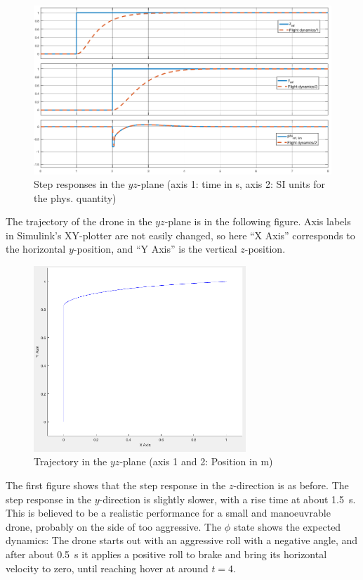 \documentclass[a4paper]{report}
\begin{document}
\begin{figure}[H]
\centering
\includegraphics[width=15cm]{img/step_response_2d.png}
\caption{Step responses in the $yz$-plane (axis 1: time in \si{\second}, axis 2: SI units for the phys. quantity)\label{fig:step_response_2d}}
\end{figure}

The trajectory of the drone in the $yz$-plane is in the following figure. 
Axis labels in Simulink's XY-plotter are not easily changed, so here ``X Axis'' corresponds to the horizontal $y$-position, and ``Y Axis'' is the vertical $z$-position.

\begin{figure}[H]
\centering
\includegraphics[width=8cm]{img/XY_plot.png}
\caption{Trajectory in the $yz$-plane (axis 1 and 2: Position in \si{\meter})\label{fig:XY_plot}}
\end{figure}

The first figure shows that the step response in the $z$-direction is as before. 
The step response in the $y$-direction is slightly slower, with a rise time at about \SI{1.5}{\second}.
This is believed to be a realistic performance for a small and manoeuvrable drone, probably on the side of too aggressive.
The $\phi$ state shows the expected dynamics: The drone starts out with an aggressive roll with a negative angle, and after about \SI{0.5}{\second} it applies a positive roll to brake and bring its horizontal velocity to zero, until reaching hover at around $t=4$.
\end{document}
